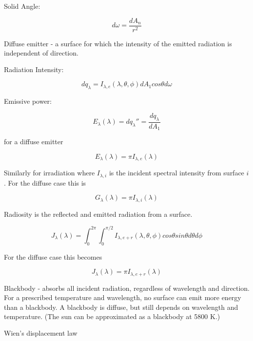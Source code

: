 \documentclass[paper=letter, fontsize=11pt]{scrartcl}
\numberwithin{equation}{section}        %
\numberwithin{figure}{section}          %
\numberwithin{table}{section}               %
\begin{document}
Solid Angle:

\begin{equation}
d\omega = \frac{dA_n}{r^2}
\end{equation}

Diffuse emitter - a surface for which the intensity of the emitted radiation is independent of direction.

Radiation Intensity:

\begin{equation}
dq_\lambda = I_{\lambda,e}(\lambda,\theta,\phi)dA_1cos\theta d\omega
\end{equation}

Emissive power:

\begin{equation}
E_\lambda(\lambda) = dq_\lambda'' = \frac{dq_\lambda}{dA_1}
\end{equation}

\noindent for a diffuse emitter

\begin{equation}
E_\lambda(\lambda) = \pi I_{\lambda,e}(\lambda)
\end{equation}

Similarly for irradiation where $I_{\lambda,i}$ is the incident spectral intensity from surface $i$. For the diffuse case this is

\begin{equation}
G_\lambda(\lambda) = \pi I_{\lambda,i}(\lambda)
\end{equation}

Radiosity is the reflected and emitted radiation from a surface.

\begin{equation}
J_\lambda(\lambda) = \int_0^{2\pi}\int_0^{\pi/2} I_{\lambda,e+r}(\lambda,\theta,\phi)cos\theta sin\theta d\theta d\phi
\end{equation}

\noindent For the diffuse case this becomes

\begin{equation}
J_\lambda(\lambda) = \pi I_{\lambda,e+r}(\lambda)
\end{equation}

Blackbody - absorbs all incident radiation, regardless of wavelength and direction. For a prescribed temperature and wavelength, no surface can emit more energy than a blackbody. A blackbody is diffuse, but still depends on wavelength and temperature. (The sun can be approximated as a blackbody at 5800 K.)

Wien’s displacement law
\end{document}
